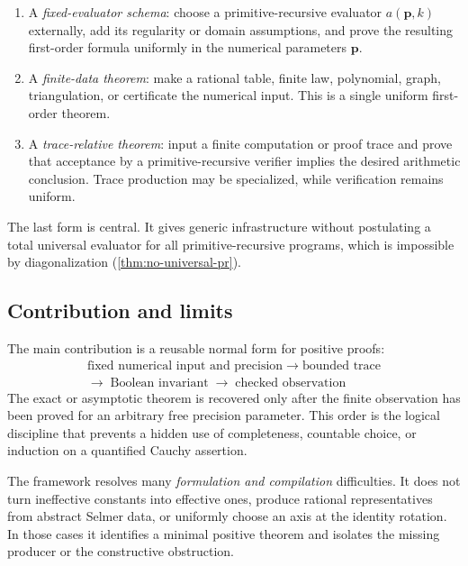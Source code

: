 \begin{enumerate}
\item A \emph{fixed-evaluator schema}: choose a primitive-recursive evaluator
      \(a(\mathbf p,k)\) externally, add its regularity or domain assumptions,
      and prove the resulting first-order formula uniformly in the numerical
      parameters \(\mathbf p\).
\item A \emph{finite-data theorem}: make a rational table, finite law,
      polynomial, graph, triangulation, or certificate the numerical input.
      This is a single uniform first-order theorem.
\item A \emph{trace-relative theorem}: input a finite computation or proof
      trace and prove that acceptance by a primitive-recursive verifier implies
      the desired arithmetic conclusion.  Trace production may be specialized,
      while verification remains uniform.
\end{enumerate}

The last form is central.  It gives generic infrastructure without postulating
a total universal evaluator for all primitive-recursive programs, which is
impossible by diagonalization (\cref{thm:no-universal-pr}).

\subsection{Contribution and limits}

The main contribution is a reusable normal form for positive proofs:
\[
\boxed{\begin{gathered}
\text{fixed numerical input and precision}\;\longrightarrow\;\text{bounded trace}\\
\longrightarrow\;\text{Boolean invariant}\;\longrightarrow\;\text{checked observation}
\end{gathered}}
\]
The exact or asymptotic theorem is recovered only after the finite observation
has been proved for an arbitrary free precision parameter.  This order is the
logical discipline that prevents a hidden use of completeness, countable
choice, or induction on a quantified Cauchy assertion.

The framework resolves many \emph{formulation and compilation} difficulties.
It does not turn ineffective constants into effective ones, produce rational
representatives from abstract Selmer data, or uniformly choose an axis at the
identity rotation.  In those cases it identifies a minimal positive theorem
and isolates the missing producer or the constructive obstruction.
